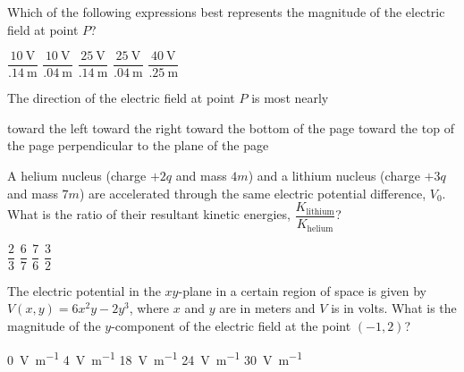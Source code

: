 \documentclass[12pt]{../oss-classkick-exam}
\begin{document}
\begin{questions}
  \question Which of the following expressions best represents the magnitude of
  the electric field at point $P$?
  \label{contour1}
  \begin{choices}
    \choice $\dfrac{\SI{10}{\volt}}{\SI{.14}{\metre}}$\hspace{.2in}
    \choice $\dfrac{\SI{10}{\volt}}{\SI{.04}{\metre}}$\hspace{.2in}
    \choice $\dfrac{\SI{25}{\volt}}{\SI{.14}{\metre}}$\hspace{.2in}
    \choice $\dfrac{\SI{25}{\volt}}{\SI{.04}{\metre}}$\hspace{.2in}
    \choice $\dfrac{\SI{40}{\volt}}{\SI{.25}{\metre}}$
  \end{choices}

  \question The direction of the electric field at point $P$ is most nearly
  \label{contour2}
  \begin{choices}
    \choice toward the left
    \choice toward the right
    \choice toward the bottom of the page
    \choice toward the top of the page
    \choice perpendicular to the plane of the page
  \end{choices}

  \uplevel{ \rule{\linewidth}{.5pt}}
  
  \question A helium nucleus (charge $+2q$ and mass $4m$) and a lithium nucleus
  (charge $+3q$ and mass $7m$) are accelerated through the same electric
  potential difference, $V_0$. What is the ratio of their resultant
  kinetic energies, $\dfrac{K_\text{lithium}}{K_\text{helium}}$?
  \begin{choices}
    \choice$\dfrac23$\hspace{.4in}
    \choice$\dfrac67$\hspace{.4in}
    \hspace{.4in}
    \choice$\dfrac76$\hspace{.4in}
    \choice$\dfrac32$
  \end{choices}
  \newpage
  
  \question The electric potential in the $xy$-plane in a certain region of
  space is given by $V(x,y)=6x^2y-2y^3$, where $x$ and $y$ are in meters and
  $V$ is in volts. What is the magnitude of the $y$-component of the electric
  field at the point $(-1,2)$?
  \begin{choices}
    \choice\SI{0}{\volt\per\metre}
    \choice\SI{4}{\volt\per\metre}
    \choice\SI{18}{\volt\per\metre}
    \choice\SI{24}{\volt\per\metre}
    \choice\SI{30}{\volt\per\metre}
  \end{choices}


\end{questions}
\end{document}
